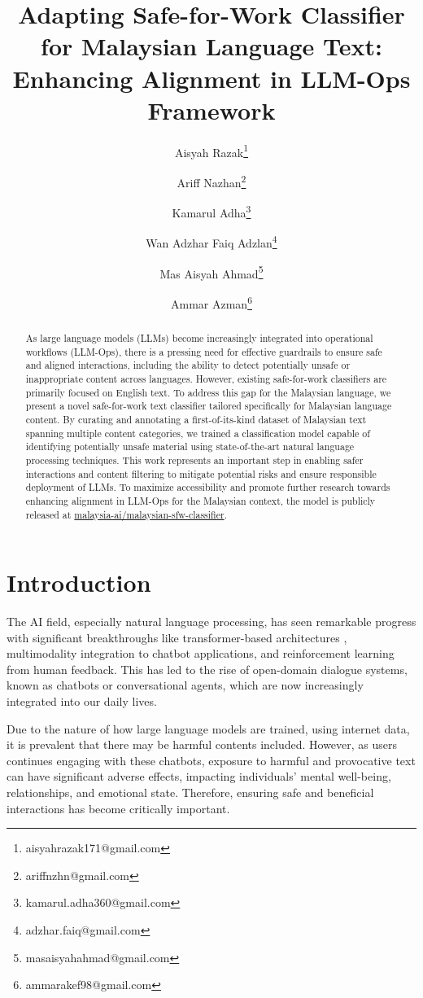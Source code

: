 \documentclass[preprint]{article}
\title{Adapting Safe-for-Work Classifier for Malaysian Language Text: Enhancing Alignment in LLM-Ops Framework}
\author{
  Aisyah Razak\thanks{aisyahrazak171@gmail.com} \and
  Ariff Nazhan\thanks{ariffnzhn@gmail.com} \and
  Kamarul Adha\thanks{kamarul.adha360@gmail.com} \and
  Wan Adzhar Faiq Adzlan\thanks{adzhar.faiq@gmail.com} \and
  Mas Aisyah Ahmad\thanks{masaisyahahmad@gmail.com} \and
  Ammar Azman\thanks{ammarakef98@gmail.com} \and
}
\begin{document}
\maketitle

\begin{abstract}

As large language models (LLMs) become increasingly integrated into operational workflows (LLM-Ops), there is a pressing need for effective guardrails to ensure safe and aligned interactions, including the ability to detect potentially unsafe or inappropriate content across languages. However, existing safe-for-work classifiers are primarily focused on English text. To address this gap for the Malaysian language, we present a novel safe-for-work text classifier tailored specifically for Malaysian language content. By curating and annotating a first-of-its-kind dataset of Malaysian text spanning multiple content categories, we trained a classification model capable of identifying potentially unsafe material using state-of-the-art natural language processing techniques. This work represents an important step in enabling safer interactions and content filtering to mitigate potential risks and ensure responsible deployment of LLMs. To maximize accessibility and promote further research towards enhancing alignment in LLM-Ops for the Malaysian context, the model is publicly released at \href{https://huggingface.co/malaysia-ai/malaysian-sfw-classifier}{malaysia-ai/malaysian-sfw-classifier}.
\end{abstract}


\section{Introduction}

The AI field, especially natural language processing, \cite{markov2023holistic} has seen remarkable progress with significant breakthroughs like transformer-based architectures \cite{vaswani2023attentionneed}, multimodality integration to chatbot applications, and reinforcement learning from human feedback. This has led to the rise of open-domain dialogue systems, known as chatbots or conversational agents, which are now increasingly integrated into our daily lives.

Due to the nature of how large language models are trained, using internet data, it is prevalent that there may be harmful contents included. However, as users continues engaging with these chatbots, exposure to harmful and provocative text can have significant adverse effects, impacting individuals' mental well-being, relationships, and emotional state. Therefore, ensuring safe and beneficial interactions has become critically important.
\end{document}
